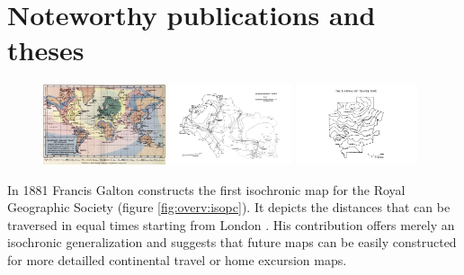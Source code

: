   \section{Noteworthy publications and theses}
    \label{sec:overv:publc}

    \begin{figure}[ht]
      {\includegraphics[width=0.32\textwidth]{./img/overv-isopc.jpg}}
      \hfill
      {\includegraphics[width=0.32\textwidth]{./img/overv-nodac.png}}
      \hfill
      {\includegraphics[width=0.32\textwidth]{./img/overv-maptt.png}}
      \label{fig:overv:1}
    \end{figure}

    In 1881 Francis Galton constructs the first isochronic map for the Royal
    Geographic Society (figure \ref{fig:overv:isopc}). It depicts the
    distances that can be traversed in equal times starting from London
    \cite{galton1881construction}. His contribution offers merely an isochronic
    generalization and suggests that future maps can be easily constructed for
    more detailled continental travel or home excursion maps.\par

